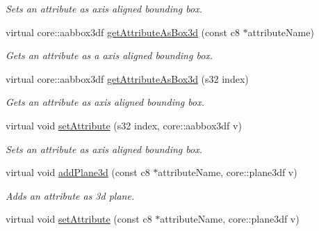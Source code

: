 \begin{DoxyCompactItemize}
\begin{DoxyCompactList}\small\item\em Sets an attribute as axis aligned bounding box. \end{DoxyCompactList}\item 
virtual core\-::aabbox3df \hyperlink{classirr_1_1io_1_1_c_attributes_a24be849aa6fbc22a7607b81349379a6c}{get\-Attribute\-As\-Box3d} (const c8 $\ast$attribute\-Name)
\begin{DoxyCompactList}\small\item\em Gets an attribute as a axis aligned bounding box. \end{DoxyCompactList}\item 
virtual core\-::aabbox3df \hyperlink{classirr_1_1io_1_1_c_attributes_a4856eca0669c64e19e6bd45545239ff8}{get\-Attribute\-As\-Box3d} (s32 index)
\begin{DoxyCompactList}\small\item\em Gets an attribute as axis aligned bounding box. \end{DoxyCompactList}\item 
\hypertarget{classirr_1_1io_1_1_c_attributes_abc6f4748afdd8865336811623098b24f}{virtual void \hyperlink{classirr_1_1io_1_1_c_attributes_abc6f4748afdd8865336811623098b24f}{set\-Attribute} (s32 index, core\-::aabbox3df v)}\label{classirr_1_1io_1_1_c_attributes_abc6f4748afdd8865336811623098b24f}

\begin{DoxyCompactList}\small\item\em Sets an attribute as axis aligned bounding box. \end{DoxyCompactList}\item 
\hypertarget{classirr_1_1io_1_1_c_attributes_a766bc2d04c4bdf29074ccf3314e6aa7f}{virtual void \hyperlink{classirr_1_1io_1_1_c_attributes_a766bc2d04c4bdf29074ccf3314e6aa7f}{add\-Plane3d} (const c8 $\ast$attribute\-Name, core\-::plane3df v)}\label{classirr_1_1io_1_1_c_attributes_a766bc2d04c4bdf29074ccf3314e6aa7f}

\begin{DoxyCompactList}\small\item\em Adds an attribute as 3d plane. \end{DoxyCompactList}\item 
\hypertarget{classirr_1_1io_1_1_c_attributes_a7b194fbe486e173e6b2a4ff49186b4cf}{virtual void \hyperlink{classirr_1_1io_1_1_c_attributes_a7b194fbe486e173e6b2a4ff49186b4cf}{set\-Attribute} (const c8 $\ast$attribute\-Name, core\-::plane3df v)}\label{classirr_1_1io_1_1_c_attributes_a7b194fbe486e173e6b2a4ff49186b4cf}


\end{DoxyCompactItemize}
